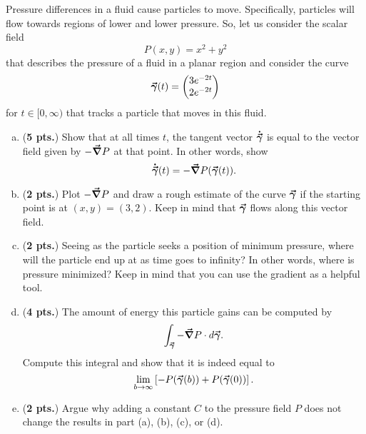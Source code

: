 \documentclass[12pt]{amsbook}
\begin{document}
\newpage
\begin{problem} Pressure differences in a fluid cause particles to move.  Specifically, particles will flow towards regions of lower and lower pressure. So, let us consider the scalar field
\[
P(x,y) = x^2+y^2
\] 
that describes the pressure of a fluid in a planar region and consider the curve
\[
\boldsymbol{\vec{\gamma}}(t) = \begin{pmatrix} 3e^{-2t} \\ 2e^{-2t} \end{pmatrix}
\]
for $t\in [0,\infty)$ that tracks a particle that moves in this fluid.
    \begin{enumerate}[(a)]
        \item (\textbf{5 pts.}) Show that at all times $t$, the tangent vector $\boldsymbol{\dot{\vec{\gamma}}}$ is equal to the vector field given by $-\boldsymbol{\vec{\nabla}} P$ at that point. In other words, show
        \[
        \boldsymbol{\dot{\vec{\gamma}}}(t) = -\boldsymbol{\vec{\nabla}} P(\boldsymbol{\vec{\gamma}}(t)).
        \]
        \vspace*{.25cm}
        
        \item (\textbf{2 pts.}) Plot $-\boldsymbol{\vec{\nabla}} P$ and draw a rough estimate of the curve $\boldsymbol{\vec{\gamma}}$ if the starting point is at $(x,y)=(3,2)$. Keep in mind that $\boldsymbol{\vec{\gamma}}$ flows along this vector field.
        \vspace*{.25cm}
        
        \item (\textbf{2 pts.}) Seeing as the particle seeks a position of minimum pressure, where will the particle end up at as time goes to infinity? In other words, where is pressure minimized? Keep in mind that you can use the gradient as a helpful tool.
        \vspace*{.25cm}
        
        \item (\textbf{4 pts.}) The amount of energy this particle gains can be computed by
        \[
        \int_{\boldsymbol{\vec{\gamma}}} -\boldsymbol{\vec{\nabla}} P \cdot d\boldsymbol{\vec{\gamma}}. 
        \]
        Compute this integral and show that it is indeed equal to
        \[
        \lim_{b\to \infty}\left[ -P(\boldsymbol{\vec{\gamma}}(b))+P(\boldsymbol{\vec{\gamma}}(0))\right].
        \]
        \vspace*{.25cm}
        
        \item (\textbf{2 pts.}) Argue why adding a constant $C$ to the pressure field $P$ does not change the results in part (a), (b), (c), or (d).  
    \end{enumerate}
\end{problem}
\end{document}
